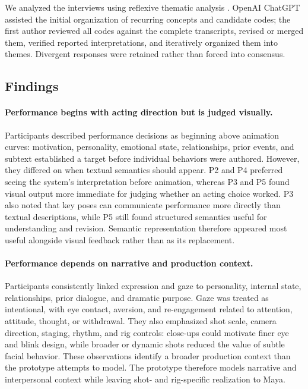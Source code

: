 We analyzed the interviews using reflexive thematic analysis \cite{braun2006thematic,braun2019reflexive}. OpenAI ChatGPT assisted the initial organization of recurring concepts and candidate codes; the first author reviewed all codes against the complete transcripts, revised or merged them, verified reported interpretations, and iteratively organized them into themes. Divergent responses were retained rather than forced into consensus.

\subsection{Findings}

\paragraph{Performance begins with acting direction but is judged visually.}
Participants described performance decisions as beginning above animation curves: motivation, personality, emotional state, relationships, prior events, and subtext established a target before individual behaviors were authored. However, they differed on when textual semantics should appear. P2 and P4 preferred seeing the system's interpretation before animation, whereas P3 and P5 found visual output more immediate for judging whether an acting choice worked. P3 also noted that key poses can communicate performance more directly than textual descriptions, while P5 still found structured semantics useful for understanding and revision. Semantic representation therefore appeared most useful alongside visual feedback rather than as its replacement.

\paragraph{Performance depends on narrative and production context.}
Participants consistently linked expression and gaze to personality, internal state, relationships, prior dialogue, and dramatic purpose. Gaze was treated as intentional, with eye contact, aversion, and re-engagement related to attention, attitude, thought, or withdrawal. They also emphasized shot scale, camera direction, staging, rhythm, and rig controls: close-ups could motivate finer eye and blink design, while broader or dynamic shots reduced the value of subtle facial behavior. These observations identify a broader production context than the prototype attempts to model. The prototype therefore models narrative and interpersonal context while leaving shot- and rig-specific realization to Maya.

